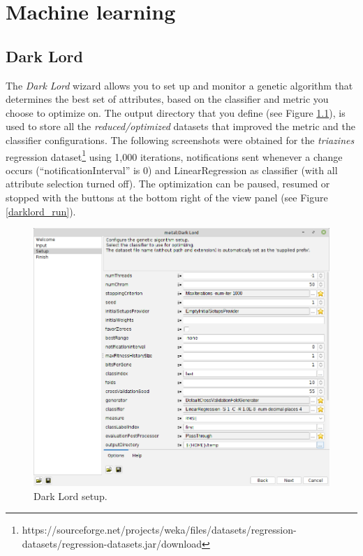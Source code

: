 
\chapter{Machine learning}

\section{Dark Lord}
The \textit{Dark Lord} wizard allows you to set up and monitor a genetic
algorithm that determines the best set of attributes, based on the classifier
and metric you choose to optimize on. The output directory that you define
(see Figure \ref{darklord_setup}), is used to store all the \textit{reduced/optimized}
datasets that improved the metric and the classifier configurations. The following screenshots were obtained for
the \textit{triazines} regression dataset\footnote{\url{}{https://sourceforge.net/projects/weka/files/datasets/regression-datasets/regression-datasets.jar/download}}
using 1,000 iterations, notifications sent whenever a change occurs (``notificationInterval'' is 0)
and LinearRegression as classifier (with all attribute selection turned off).
The optimization can be paused, resumed or stopped with the buttons at the
bottom right of the view panel (see Figure \ref{darklord_run}).

\begin{figure}[htb]
  \centering
  \includegraphics[width=12.0cm]{images/darklord_setup.png}
  \caption{Dark Lord setup.}
  \label{darklord_setup}
\end{figure}

